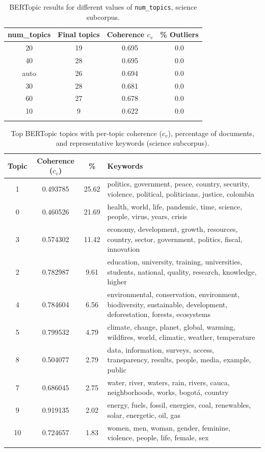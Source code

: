 \documentclass[pdflatex,sn-mathphys-num,iicol]{sn-jnl}
\begin{document}
	
	\begin{table}[h!]
		\caption{BERTopic results for different values of \texttt{num\_topics}, science subcorpus.}
		\label{tab:bertopic_nr_topics_ciencia}
		\centering
		\footnotesize
		\begin{tabular}{@{}cccc@{}}
			\toprule
			\textbf{num\_topics} & \textbf{Final topics} & \textbf{Coherence $c_v$} & \textbf{\% Outliers} \\
			\midrule
			20   & 19 & 0.695 & 0.0 \\
			40   & 28 & 0.695 & 0.0 \\
			auto & 26 & 0.694 & 0.0 \\
			30   & 28 & 0.681 & 0.0 \\
			60   & 27 & 0.678 & 0.0 \\
			10   & 9  & 0.622 & 0.0 \\
			\botrule
		\end{tabular}
	\end{table}
	
	
	\begin{table}[h!]
		\caption{Top BERTopic topics with per-topic coherence ($c_v$), percentage of documents, and representative keywords (science subcorpus).}
		\label{tab:topics_ciencia}
		\begin{tabularx}{\textwidth}{@{}cccX@{}}
			\toprule
			\textbf{Topic} & \textbf{Coherence ($c_v$)} & \textbf{\%} & \textbf{Keywords} \\
			\midrule
			1  & 0.493785 & 25.62 & politics, government, peace, country, security, violence, political, politicians, justice, colombia \\
			0  & 0.460526 & 21.69 & health, world, life, pandemic, time, science, people, virus, years, crisis \\
			3  & 0.574302 & 11.42 & economy, development, growth, resources, country, sector, government, politics, fiscal, innovation \\
			2  & 0.782987 & 9.61  & education, university, training, universities, students, national, quality, research, knowledge, higher \\
			4  & 0.784604 & 6.56  & environmental, conservation, environment, biodiversity, sustainable, development, deforestation, forests, ecosystems \\
			5  & 0.799532 & 4.79  & climate, change, planet, global, warming, wildfires, world, climatic, weather, temperature \\
			8  & 0.504077 & 2.79  & data, information, surveys, access, transparency, results, people, media, example, public \\
			7  & 0.686045 & 2.75  & water, river, waters, rain, rivers, cauca, neighborhoods, works, bogotá, country \\
			9  & 0.919135 & 2.02  & energy, fuels, fossil, energies, coal, renewables, solar, energetic, oil, gas \\
			10 & 0.724657 & 1.83  & women, men, woman, gender, feminine, violence, people, life, female, sex \\
			\botrule
		\end{tabularx}
	\end{table}
	
\end{document}
